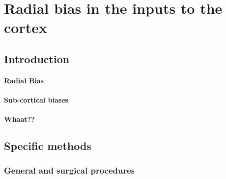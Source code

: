 \chapter{Radial bias in the inputs to the cortex}
	\section{Introduction}
	
	\subsubsection{Radial Bias}
	\subsubsection{Sub-cortical biases}
	\subsubsection{Whaat??}
	
	
	\section{Specific methods}
	\subsection{General and surgical procedures}
	

